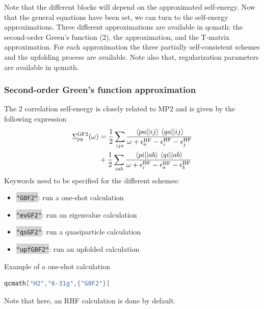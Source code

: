 \documentclass[aip,jcp,reprint,noshowkeys,superscriptaddress]{revtex4-1}
\newcommand{\GW}{\text{$GW$}}
\newcommand{\GFtwo}{\text{GF}2}
\newcommand{\GF}{\text{GF}}
\newcommand{\HF}{\text{HF}}
\newcommand{\ep}{\epsilon}
\newcommand{\Sigm}{\Sigma}
\newcommand{\ERI}[2]{\mel{#1}{}{#2}}
\newcommand{\keyword}[1]{{\colorbox{lightgray}{\texttt{#1}}}}
\begin{document}
Note that the different blocks will depend on the approximated self-energy. Now that the general equations have been set, we can turn to the self-energy approximations. Three different approximations are available in qcmath: the second-order Green's function (\GFtwo), the {\GW} approximation, and the T-matrix approximation. For each approximation the three partially self-consistent schemes and the upfolding process are available. Note also that, regularization parameters are available in qcmath.
 
\subsubsection*{Second-order Green's function approximation}
The {\GFtwo} correlation self-energy is closely related to MP2 and is given by the following expression
\begin{equation}
\label{eq:SigCGF2}
\begin{split}
	\Sigm_{pq}^{\GF2}(\omega) 
	& = \frac{1}{2}\sum_{ija} \frac{\ERI{pa}{ij} \ERI{qa}{ij}}{\omega + \ep_{a}^{\HF} - \ep_{i}^{\HF} - \ep_{j}^{\HF}}
	\\
	& + \frac{1}{2}\sum_{iab} \frac{\ERI{pi}{ab} \ERI{qi}{ab}}{\omega + \ep_{i}^{\HF} - \ep_{a}^{\HF} - \ep_{b}^{\HF}}
\end{split}
\end{equation}
Keywords need to be specified for the different schemes: 
\begin{itemize}
\item \keyword{"G0F2"}: run a one-shot calculation
\item \keyword{"evGF2"}: run an eigenvalue calculation 
\item \keyword{"qsGF2"}: run a quasiparticle calculation 
\item \keyword{"upfG0F2"}: run an upfolded calculation
\end{itemize}

Example of a one-shot calculation
\begin{lstlisting}[extendedchars=true,language=Mathematica]
	qcmath["H2","6-31g",{"G0F2"}]
\end{lstlisting}
Note that here, an RHF calculation is done by default.
\end{document}
